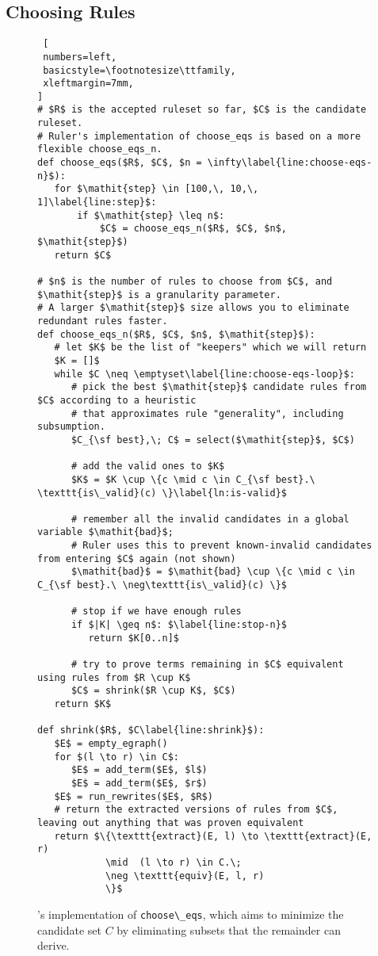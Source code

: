 \subsection{Choosing Rules}
\label{subsec:select}
\label{subsec:choose}

\begin{figure}
\begin{lstlisting} [
 numbers=left,
 basicstyle=\footnotesize\ttfamily,
 xleftmargin=7mm,
]
# $R$ is the accepted ruleset so far, $C$ is the candidate ruleset.
# Ruler's implementation of choose_eqs is based on a more flexible choose_eqs_n.
def choose_eqs($R$, $C$, $n = \infty\label{line:choose-eqs-n}$):
   for $\mathit{step} \in [100,\, 10,\, 1]\label{line:step}$:
       if $\mathit{step} \leq n$:
           $C$ = choose_eqs_n($R$, $C$, $n$, $\mathit{step}$)
   return $C$

# $n$ is the number of rules to choose from $C$, and $\mathit{step}$ is a granularity parameter.
# A larger $\mathit{step}$ size allows you to eliminate redundant rules faster.
def choose_eqs_n($R$, $C$, $n$, $\mathit{step}$):
   # let $K$ be the list of "keepers" which we will return
   $K = []$
   while $C \neq \emptyset\label{line:choose-eqs-loop}$:
      # pick the best $\mathit{step}$ candidate rules from $C$ according to a heuristic
      # that approximates rule "generality", including subsumption.
      $C_{\sf best},\; C$ = select($\mathit{step}$, $C$)

      # add the valid ones to $K$
      $K$ = $K \cup \{c \mid c \in C_{\sf best}.\ \texttt{is\_valid}(c) \}\label{ln:is-valid}$

      # remember all the invalid candidates in a global variable $\mathit{bad}$;
      # Ruler uses this to prevent known-invalid candidates from entering $C$ again (not shown)
      $\mathit{bad}$ = $\mathit{bad} \cup \{c \mid c \in C_{\sf best}.\ \neg\texttt{is\_valid}(c) \}$

      # stop if we have enough rules
      if $|K| \geq n$: $\label{line:stop-n}$
         return $K[0..n]$

      # try to prove terms remaining in $C$ equivalent using rules from $R \cup K$
      $C$ = shrink($R \cup K$, $C$)
   return $K$

def shrink($R$, $C\label{line:shrink}$):
   $E$ = empty_egraph()
   for $(l \to r) \in C$:
      $E$ = add_term($E$, $l$)
      $E$ = add_term($E$, $r$)
   $E$ = run_rewrites($E$, $R$)
   # return the extracted versions of rules from $C$, leaving out anything that was proven equivalent
   return $\{\texttt{extract}(E, l) \to \texttt{extract}(E, r)
            \mid  (l \to r) \in C.\;
            \neg \texttt{equiv}(E, l, r)
            \}$

\end{lstlisting}
  \caption{
    's implementation of \lstinline{choose\_eqs},
    which aims to minimize the candidate set $C$
    by eliminating subsets that the remainder can derive.
  }
  \label{fig:choose-eqs}
\end{figure}

